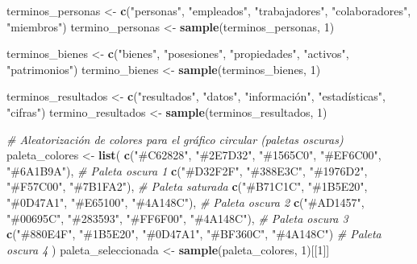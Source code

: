 \documentclass[
]{article}
\newenvironment{Shaded}{\begin{snugshade}}{\end{snugshade}}
\newcommand{\CommentTok}[1]{\textcolor[rgb]{0.56,0.35,0.01}{\textit{#1}}}
\newcommand{\DecValTok}[1]{\textcolor[rgb]{0.00,0.00,0.81}{#1}}
\newcommand{\FunctionTok}[1]{\textcolor[rgb]{0.13,0.29,0.53}{\textbf{#1}}}
\newcommand{\NormalTok}[1]{#1}
\newcommand{\OtherTok}[1]{\textcolor[rgb]{0.56,0.35,0.01}{#1}}
\newcommand{\StringTok}[1]{\textcolor[rgb]{0.31,0.60,0.02}{#1}}
\begin{document}
\begin{Shaded}
\begin{Highlighting}[]
\NormalTok{terminos\_personas }\OtherTok{\textless{}{-}} \FunctionTok{c}\NormalTok{(}\StringTok{"personas"}\NormalTok{, }\StringTok{"empleados"}\NormalTok{, }\StringTok{"trabajadores"}\NormalTok{, }\StringTok{"colaboradores"}\NormalTok{, }\StringTok{"miembros"}\NormalTok{)}
\NormalTok{termino\_personas }\OtherTok{\textless{}{-}} \FunctionTok{sample}\NormalTok{(terminos\_personas, }\DecValTok{1}\NormalTok{)}

\NormalTok{terminos\_bienes }\OtherTok{\textless{}{-}} \FunctionTok{c}\NormalTok{(}\StringTok{"bienes"}\NormalTok{, }\StringTok{"posesiones"}\NormalTok{, }\StringTok{"propiedades"}\NormalTok{, }\StringTok{"activos"}\NormalTok{, }\StringTok{"patrimonios"}\NormalTok{)}
\NormalTok{termino\_bienes }\OtherTok{\textless{}{-}} \FunctionTok{sample}\NormalTok{(terminos\_bienes, }\DecValTok{1}\NormalTok{)}

\NormalTok{terminos\_resultados }\OtherTok{\textless{}{-}} \FunctionTok{c}\NormalTok{(}\StringTok{"resultados"}\NormalTok{, }\StringTok{"datos"}\NormalTok{, }\StringTok{"información"}\NormalTok{, }\StringTok{"estadísticas"}\NormalTok{, }\StringTok{"cifras"}\NormalTok{)}
\NormalTok{termino\_resultados }\OtherTok{\textless{}{-}} \FunctionTok{sample}\NormalTok{(terminos\_resultados, }\DecValTok{1}\NormalTok{)}

\CommentTok{\# Aleatorización de colores para el gráfico circular (paletas oscuras)}
\NormalTok{paleta\_colores }\OtherTok{\textless{}{-}} \FunctionTok{list}\NormalTok{(}
  \FunctionTok{c}\NormalTok{(}\StringTok{"\#C62828"}\NormalTok{, }\StringTok{"\#2E7D32"}\NormalTok{, }\StringTok{"\#1565C0"}\NormalTok{, }\StringTok{"\#EF6C00"}\NormalTok{, }\StringTok{"\#6A1B9A"}\NormalTok{),  }\CommentTok{\# Paleta oscura 1}
  \FunctionTok{c}\NormalTok{(}\StringTok{"\#D32F2F"}\NormalTok{, }\StringTok{"\#388E3C"}\NormalTok{, }\StringTok{"\#1976D2"}\NormalTok{, }\StringTok{"\#F57C00"}\NormalTok{, }\StringTok{"\#7B1FA2"}\NormalTok{),  }\CommentTok{\# Paleta saturada}
  \FunctionTok{c}\NormalTok{(}\StringTok{"\#B71C1C"}\NormalTok{, }\StringTok{"\#1B5E20"}\NormalTok{, }\StringTok{"\#0D47A1"}\NormalTok{, }\StringTok{"\#E65100"}\NormalTok{, }\StringTok{"\#4A148C"}\NormalTok{),  }\CommentTok{\# Paleta oscura 2}
  \FunctionTok{c}\NormalTok{(}\StringTok{"\#AD1457"}\NormalTok{, }\StringTok{"\#00695C"}\NormalTok{, }\StringTok{"\#283593"}\NormalTok{, }\StringTok{"\#FF6F00"}\NormalTok{, }\StringTok{"\#4A148C"}\NormalTok{),  }\CommentTok{\# Paleta oscura 3}
  \FunctionTok{c}\NormalTok{(}\StringTok{"\#880E4F"}\NormalTok{, }\StringTok{"\#1B5E20"}\NormalTok{, }\StringTok{"\#0D47A1"}\NormalTok{, }\StringTok{"\#BF360C"}\NormalTok{, }\StringTok{"\#4A148C"}\NormalTok{)   }\CommentTok{\# Paleta oscura 4}
\NormalTok{)}
\NormalTok{paleta\_seleccionada }\OtherTok{\textless{}{-}} \FunctionTok{sample}\NormalTok{(paleta\_colores, }\DecValTok{1}\NormalTok{)[[}\DecValTok{1}\NormalTok{]]}


\end{Highlighting}
\end{Shaded}
\end{document}
